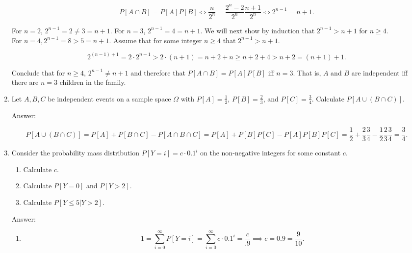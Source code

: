 \documentclass{article}
\begin{document}
\begin{enumerate}
$$
P[A\cap B] = P[A]P[B] \iff \frac{n}{2^n} = \frac{2^n -2}{2^n}\frac{n+1}{2^n} \iff 2^{n-1} = n+1.
$$

For $n = 2$, $2^{n-1} = 2 \neq 3 = n+1$. For $n = 3$, $2^{n-1} = 4 = n+1$. We will next show by induction that $2^{n-1} > n+1$ for $n\geq 4$. \\

For $n = 4, 2^{n-1} = 8 > 5 = n+1$. Assume that for some integer $n\geq 4$ that $2^{n-1} > n+1$. 

$$
2^{(n-1) + 1} = 2\cdot 2^{n-1} > 2 \cdot (n+1) = n+2 + n \geq n + 2 + 4 > n+2 = (n+1) + 1.
$$

Conclude that for $n \geq 4$, $2^{n-1} \neq n+1$ and therefore that $P[A\cap B] = P[A]P[B]$ iff $n = 3$. That is, $A$ and $B$ are independent iff there are $n = 3$ children in the family. 



\item

Let $A, B, C$ be independent events on a sample space $\Omega$ with $P[A] = \frac{1}{2}$, $P[B] = \frac{2}{3}$, and $P[C] = \frac{3}{4}$. Calculate $P[A \cup (B\cap C)]$. 

Answer:

$$
P[A \cup (B \cap C)]
= P[A] + P[B\cap C] - P[A\cap B \cap C]
= P[A] + P[B]P[C] - P[A]P[B]P[C]
= \frac{1}{2} + \frac{2}{3}\frac{3}{4} - \frac{1}{2}\frac{2}{3}\frac{3}{4}
= \frac{3}{4}.
$$


\item

Consider the probability mass distribution $P[Y = i] = c \cdot 0.1^i$ on the non-negative integers for some constant $c$.

\begin{enumerate}
\item Calculate $c$.

\item Calculate $P[Y = 0]$ and $P[Y > 2]$.

\item Calculate $P[Y \leq 5 \vert Y > 2]$.

\end{enumerate}

Answer:

\begin{enumerate}
\item

$$
1 = \sum_{i=0}^\infty P[Y = i] = \sum_{i=0}^\infty c \cdot 0.1^i = \frac{c}{.9} \implies c = 0.9 = \frac{9}{10}.
$$


\end{enumerate}
\end{enumerate}
\end{document}
